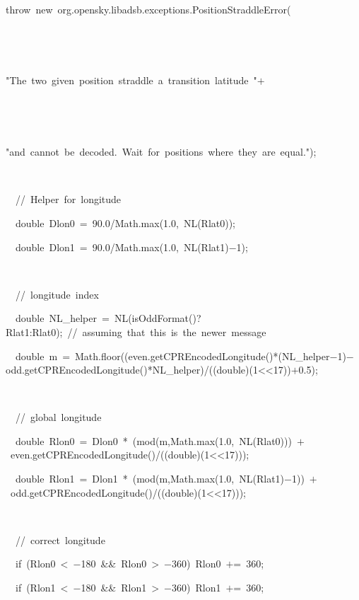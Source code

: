 {{$${\ }}{\hlstd\ \ }{\hlstd throw\ new\ org.opensky.libadsb.exceptions.PositionStraddleError(\leavevmode\par
{\ }}{\hlstd\ \ \ }{\hlstd "The\ two\ given\ position\ straddle\ a\ transition\ latitude\ "$\mathord{+}$\leavevmode\par
{\ }}{\hlstd\ \ \ }{\hlstd "and\ cannot\ be\ decoded.\ Wait\ for\ positions\ where\ they\ are\ equal.");\leavevmode\par
{\ }\leavevmode\par
{\ }\ //\ Helper\ for\ longitude\leavevmode\par
{\ }\ double\ Dlon0\ $\mathord{=}$\ 90.0/Math.max(1.0,\ NL(Rlat0));\leavevmode\par
{\ }\ double\ Dlon1\ $\mathord{=}$\ 90.0/Math.max(1.0,\ NL(Rlat1)$\mathord{-}$1);\leavevmode\par
{\ }\leavevmode\par
{\ }\ //\ longitude\ index\leavevmode\par
{\ }\ double\ NL\_{}helper\ $\mathord{=}$\ NL(isOddFormat()?Rlat1:Rlat0);\ //\ assuming\ that\ this\ is\ the\ newer\ message\leavevmode\par
{\ }\ double\ m\ $\mathord{=}$\ Math.floor((even.getCPREncodedLongitude()*(NL\_{}helper$\mathord{-}$1)$\mathord{-}$odd.getCPREncodedLongitude()*NL\_{}helper)/((double)(1$\mathord{<}$$\mathord{<}$17))$\mathord{+}$0.5);\leavevmode\par
{\ }\leavevmode\par
{\ }\ //\ global\ longitude\leavevmode\par
{\ }\ double\ Rlon0\ $\mathord{=}$\ Dlon0\ *\ (mod(m,Math.max(1.0,\ NL(Rlat0)))\ $\mathord{+}$\ even.getCPREncodedLongitude()/((double)(1$\mathord{<}$$\mathord{<}$17)));\leavevmode\par
{\ }\ double\ Rlon1\ $\mathord{=}$\ Dlon1\ *\ (mod(m,Math.max(1.0,\ NL(Rlat1)$\mathord{-}$1))\ $\mathord{+}$\ odd.getCPREncodedLongitude()/((double)(1$\mathord{<}$$\mathord{<}$17)));\leavevmode\par
{\ }\leavevmode\par
{\ }\ //\ correct\ longitude\leavevmode\par
{\ }\ if\ (Rlon0\ $\mathord{<}$\ $\mathord{-}$180\ \&{}\&{}\ Rlon0\ $\mathord{>}$\ $\mathord{-}$360)\ Rlon0\ $\mathord{+}$$\mathord{=}$\ 360;\leavevmode\par
{\ }\ if\ (Rlon1\ $\mathord{<}$\ $\mathord{-}$180\ \&{}\&{}\ Rlon1\ $\mathord{>}$\ $\mathord{-}$360)\ Rlon1\ $\mathord{+}$$\mathord{=}$\ 360;\leavevmode\par
$$}}
